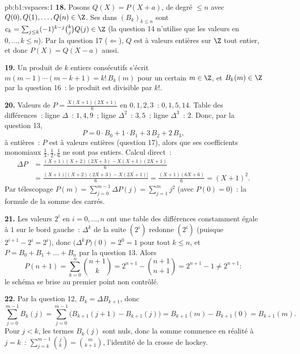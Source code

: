 \begin{solution}{pb:b1:vspaces:1}
\textbf{18.} Posons $Q(X) = P(X + a)$,  de degré $\leq
n$ avec $Q(0), Q(1), \dots, Q(n) \in \Z$. Ses  dans
$(B_k)_{k \leq n}$ sont $c_k = \sum_{j \leq k}(-1)^{k-j}\binom kj
Q(j) \in \Z$ (la question 14 n'utilise que les valeurs en $0, \dots, k
\leq n$). Par la question 17 ($\Leftarrow$), $Q$ est à valeurs entières
sur $\Z$ tout entier, et donc $P(X) = Q(X - a)$ aussi.

\textbf{19.} Un produit de $k$ entiers consécutifs s'écrit $m(m-1)
\cdots(m-k+1) = k!\,B_k(m)$ pour un certain $m \in \Z$, et $B_k(m) \in
\Z$ par la question 16~: le produit est divisible par $k!$.

\textbf{20.} Valeurs de $P = \frac{X(X+1)(2X+1)}{6}$ en $0,1,2,3$~:
$0, 1, 5, 14$. Table des différences~: ligne $\Delta$~: $1, 4, 9$~;
ligne $\Delta^2$~: $3, 5$~; ligne $\Delta^3$~: $2$. Donc, par la
question 13,
\[
P = 0\cdot B_0 + 1\cdot B_1 + 3\,B_2 + 2\,B_3 ,
\]
à  entières~: $P$ est à valeurs entières (question 17),
alors que ses coefficients monomiaux $\frac13, \frac12, \frac16$ ne
sont pas entiers. Calcul direct~:
\begin{align*}
\Delta P &= \frac{(X+1)(X+2)(2X+3) - X(X+1)(2X+1)}{6} \\
&= \frac{(X+1)\bigl[(X+2)(2X+3) - X(2X+1)\bigr]}{6}
= \frac{(X+1)(6X+6)}{6} = (X+1)^2 .
\end{align*}
Par télescopage $P(m) = \sum_{j=0}^{m-1}\Delta P(j) = \sum_{j=1}^{m}
j^2$ (avec $P(0) = 0$)~: la formule de la somme des carrés.

\textbf{21.} Les valeurs $2^i$ en $i = 0, \dots, n$ ont une table des
différences constamment égale à $1$ sur le bord gauche~: $\Delta^k$ de
la suite $(2^i)$ redonne $(2^i)$ (puisque $2^{i+1} - 2^i = 2^i$), donc
$\bigl(\Delta^k P\bigr)(0) = 2^0 = 1$ pour tout $k \leq n$, et $P =
B_0 + B_1 + \dots + B_n$ par la question 13. Alors
\[
P(n+1) = \sum_{k=0}^{n}\binom{n+1}{k}
= 2^{n+1} - \binom{n+1}{n+1} = 2^{n+1} - 1 \neq 2^{n+1}:
\]
le schéma se brise au premier point non contrôlé.

\textbf{22.} Par la question 12, $B_k = \Delta B_{k+1}$, donc
\[
\sum_{j=0}^{m-1} B_k(j)
= \sum_{j=0}^{m-1}\bigl(B_{k+1}(j+1) - B_{k+1}(j)\bigr)
= B_{k+1}(m) - B_{k+1}(0) = B_{k+1}(m).
\]
Pour $j < k$, les termes $B_k(j)$ sont nuls, donc la somme commence en
réalité à $j = k$~: $\sum_{j=k}^{m-1}\binom jk = \binom m{k+1}$,
l'identité de la crosse de hockey.


\end{solution}

